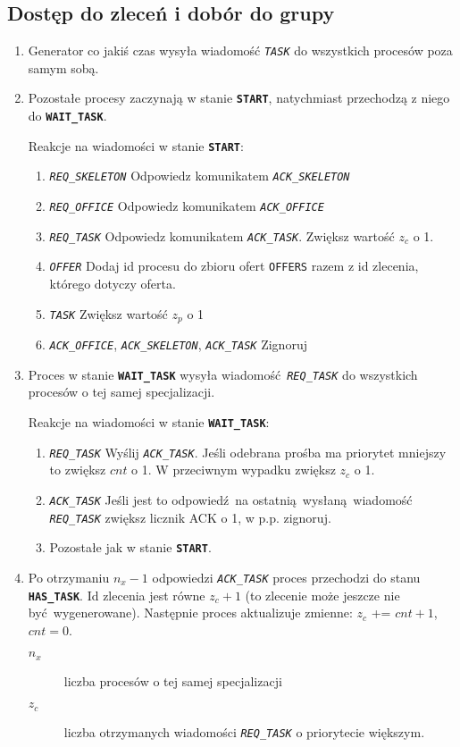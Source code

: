 \documentclass[12pt]{article}
\newcommand{\state}[1]{\texttt{\textbf{#1}}}
\newcommand{\msg}[1]{\texttt{\emph{#1}}}
\newcommand{\var}[1]{\texttt{#1}}
\begin{document}
\subsection{Dostęp do zleceń i dobór do grupy}
\begin{enumerate}
	\item Generator co jakiś czas wysyła wiadomość \msg{TASK} do wszystkich procesów poza samym sobą.
	
	\item Pozostałe procesy zaczynają w stanie \state{START}, natychmiast przechodzą z niego do \state{WAIT\_TASK}.
	
	Reakcje na wiadomości w stanie \state{START}:
	\begin{enumerate}
		\item \msg{REQ\_SKELETON} Odpowiedz komunikatem \msg{ACK\_SKELETON}
		\item \msg{REQ\_OFFICE} Odpowiedz komunikatem \msg{ACK\_OFFICE}
		\item \msg{REQ\_TASK} Odpowiedz komunikatem \msg{ACK\_TASK}. Zwiększ wartość $z_c$ o 1.
		\item \msg{OFFER} Dodaj id procesu do zbioru ofert \var{OFFERS} razem z id zlecenia, którego dotyczy oferta.
		\item \msg{TASK} Zwiększ wartość $z_p$ o 1
		\item \msg{ACK\_OFFICE}, \msg{ACK\_SKELETON}, \msg{ACK\_TASK} Zignoruj
	\end{enumerate}
		
	\item Proces w stanie \state{WAIT\_TASK} wysyła wiadomość \msg{REQ\_TASK} do wszystkich procesów o tej samej specjalizacji.
	
	Reakcje na wiadomości w stanie \state{WAIT\_TASK}:
	\begin{enumerate}
		\item \msg{REQ\_TASK} Wyślij \msg{ACK\_TASK}. Jeśli odebrana prośba ma priorytet mniejszy to zwiększ $cnt$ o 1. W przeciwnym wypadku zwiększ $z_c$ o 1.
		\item \msg{ACK\_TASK} Jeśli jest to odpowiedź na ostatnią wysłaną wiadomość \msg{REQ\_TASK} zwiększ licznik ACK o 1, w p.p. zignoruj.
		\item Pozostałe jak w stanie \state{START}.
	\end{enumerate}
		
	\item Po otrzymaniu $n_x - 1$ odpowiedzi \msg{ACK\_TASK} proces przechodzi do stanu \state{HAS\_TASK}. Id zlecenia jest równe $z_c + 1$ (to zlecenie może jeszcze nie być wygenerowane). Następnie proces aktualizuje zmienne: $z_c$ += $cnt + 1$, $cnt = 0$.
	\begin{description}
		\item[$n_x$] liczba procesów o tej samej specjalizacji
		\item[$z_c$] liczba otrzymanych wiadomości \msg{REQ\_TASK} o priorytecie większym.
	\end{description}
			

\end{enumerate}
\end{document}
